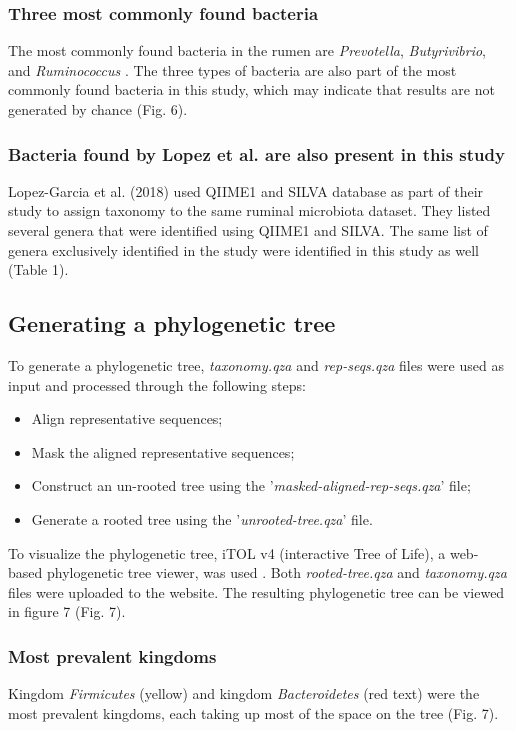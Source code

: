 \documentclass{singlecol-new}
\theoremstyle{TH}{
\newtheorem{lemma}{Lemma}
\newtheorem{theorem}[lemma]{Theorem}
\newtheorem{corrolary}[lemma]{Corrolary}
\newtheorem{conjecture}[lemma]{Conjecture}
\newtheorem{proposition}[lemma]{Proposition}
\newtheorem{claim}[lemma]{Claim}
\newtheorem{stheorem}[lemma]{Wrong Theorem}
\newtheorem{algorithm}{Algorithm}
}
\theoremstyle{THrm}{
\newtheorem{definition}{Definition}[section]
\newtheorem{question}{Question}[section]
\newtheorem{remark}{Remark}
\newtheorem{scheme}{Scheme}
}
\theoremstyle{THhit}{
\newtheorem{case}{Case}[section]
}
\begin{document}
\subsubsection{Three most commonly found bacteria}

The most commonly found bacteria in the rumen are \textit{Prevotella}, \textit{Butyrivibrio}, and \textit{Ruminococcus} \citep{matthews2018rumen}. The three types of bacteria are also part of the most commonly found bacteria in this study, which may indicate that results are not generated by chance (Fig. 6).  

\subsubsection{Bacteria found by Lopez et al. are also present in this study}

Lopez-Garcia et al. (2018) used QIIME1 and SILVA database as part of their study to assign taxonomy to the same ruminal microbiota dataset. They listed several genera that were identified using QIIME1 and SILVA. The same list of genera exclusively identified in the study were identified in this study as well (Table 1).

\subsection{Generating a phylogenetic tree}

To generate a phylogenetic tree, \textit{taxonomy.qza} and \textit{rep-seqs.qza} files were used as input and processed through the following steps:
\begin{itemize}
    \item Align representative sequences;
    \item Mask the aligned representative sequences;
    \item Construct an un-rooted tree using the '\textit{masked-aligned-rep-seqs.qza}' file;
    \item Generate a rooted tree using the '\textit{unrooted-tree.qza}' file.
\end{itemize}

To visualize the phylogenetic tree, iTOL v4 (interactive Tree of Life), a web-based phylogenetic tree viewer, was used \citep{itolv4}. Both \textit{rooted-tree.qza} and \textit{taxonomy.qza} files were uploaded to the website. The resulting phylogenetic tree can be viewed in figure 7 (Fig. 7). 

\subsubsection{Most prevalent kingdoms}
Kingdom \textit{Firmicutes} (yellow) and kingdom \textit{Bacteroidetes} (red text) were the most prevalent kingdoms, each taking up most of the space on the tree (Fig. 7).
\end{document}
